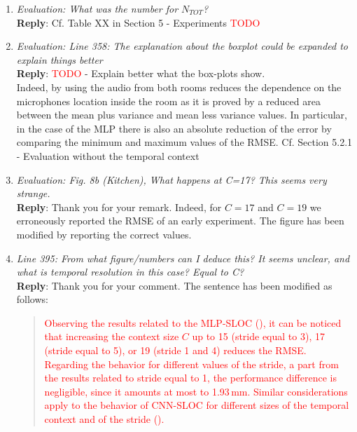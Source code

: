 \documentclass[11pt, technote, letterpaper, oneside, onecolumn]{IEEEtran}
\begin{document}
\begin{enumerate}
\item \textit{Evaluation: What was the number for $N_{TOT}$?\\}
\textbf{Reply}: Cf. Table XX in Section 5 - Experiments \textcolor{red}{TODO}

\item \textit{Evaluation: Line 358: The explanation about the boxplot could be expanded to explain things better\\}
\textbf{Reply}: \textcolor{red}{TODO} - Explain better what the box-plots show.\\
Indeed, by using the audio from both rooms reduces the dependence on the microphones location inside the room as it is proved by a reduced area between the mean plus variance and mean less variance values. In particular, in the case of the MLP there is also an absolute reduction of the error by comparing the minimum and maximum values of the RMSE. Cf. Section 5.2.1 - Evaluation without the temporal context

\item \textit{Evaluation: Fig. 8b (Kitchen), What happens at C=17? This seems very strange.\\}
\textbf{Reply}: Thank you for your remark. Indeed, for $C=17$ and $C=19$ we erroneously reported the RMSE of an early experiment. The figure has been modified by reporting the correct values.

\item \textit{Line 395: From what figure/numbers can I deduce this? It seems unclear, and what is temporal resolution in this case? Equal to C?\\}
\textbf{Reply}: Thank you for your comment. The sentence has been modified as follows:
\begin{quote}
\textcolor{red}{Observing the results related to the MLP-SLOC (), it can be noticed that increasing the context size $C$ up to 15 (stride equal to 3), 17 (stride equal to 5), or 19 (stride 1 and 4) reduces the RMSE. Regarding the behavior for different values of the stride, a part from the results related to stride equal to 1, the performance difference is negligible, since it amounts at most to 1.93\,mm. Similar considerations apply to the behavior of CNN-SLOC for different sizes of the temporal context and of the stride ().}
\end{quote}



\end{enumerate}
\end{document}
